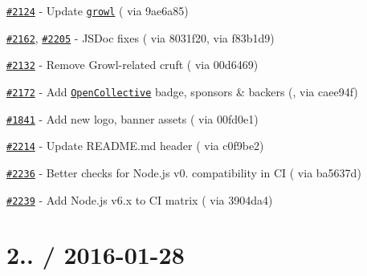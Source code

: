 \begin{DoxyItemize}
\item \href{https://github.com/mochajs/mocha/pull/2124}{\tt \#2124} -\/ Update \href{https://npmjs.com/package/growl}{\tt growl} (\href{https://github.com/benjamine}{\tt } via 9ae6a85)
\item \href{https://github.com/mochajs/mocha/pull/2162}{\tt \#2162}, \href{https://github.com/mochajs/mocha/pull/2205}{\tt \#2205} -\/ J\+S\+Doc fixes (\href{https://github.com/OlegTsyba}{\tt } via 8031f20, \href{https://github.com/ScottFreeCode}{\tt } via f83b1d9)
\item \href{https://github.com/mochajs/mocha/issues/2132}{\tt \#2132} -\/ Remove Growl-\/related cruft (\href{https://github.com/julienw}{\tt } via 00d6469)
\item \href{https://github.com/mochajs/mocha/pull/2172}{\tt \#2172} -\/ Add \href{https://opencollective.com}{\tt Open\+Collective} badge, sponsors \& backers (\href{https://github.com/xdamman}{\tt }, \href{https://github.com/boneskull}{\tt } via caee94f)
\item \href{https://github.com/mochajs/mocha/pull/1841}{\tt \#1841} -\/ Add new logo, banner assets (\href{https://github.com/dasilvacontin}{\tt } via 00fd0e1)
\item \href{https://github.com/mochajs/mocha/pull/2214}{\tt \#2214} -\/ Update {\ttfamily R\+E\+A\+D\+M\+E.\+md} header (\href{https://github.com/dasilvacontin}{\tt } via c0f9be2)
\item \href{https://github.com/mochajs/mocha/pull/2236}{\tt \#2236} -\/ Better checks for Node.\+js v0. compatibility in CI (\href{https://github.com/dasilvacontin}{\tt } via ba5637d)
\item \href{https://github.com/mochajs/mocha/issues/2239}{\tt \#2239} -\/ Add Node.\+js v6.\+x to CI matrix (\href{https://github.com/boneskull}{\tt } via 3904da4)
\end{DoxyItemize}

\section*{2.. / 2016-\/01-\/28}


